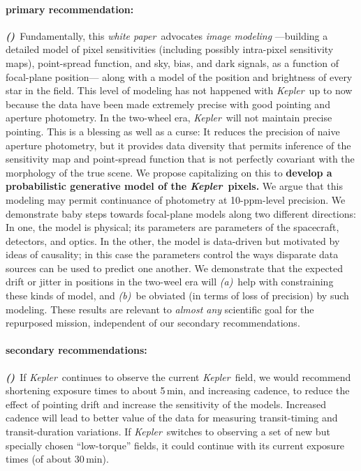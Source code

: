 \documentclass[letterpaper,12pt,preprint]{aastex}
\newcommand{\documentname}{\textsl{white paper}}
\newcommand{\observatory}[1]{\textsl{#1}}
\newcommand{\kepler}{\observatory{Kepler}}
\newcommand{\Kepler}{\kepler}
\newcounter{hoggitem}
\newcommand{\hoggitem}{\refstepcounter{hoggitem}\textbf{\textsl{(\thehoggitem)}}}
\begin{document}
\paragraph{primary recommendation:}
\hoggitem~Fundamentally, this \documentname\ advocates \emph{image modeling}%
  ---building a detailed model of pixel sensitivities
  (including possibly intra-pixel sensitivity maps),
  point-spread function,
  and sky, bias, and dark signals,
  as a function of focal-plane position---%
  along with a model of the position and brightness of every star in the field.
This level of modeling has not happened with \Kepler\ up to now
  because the data have been made extremely precise with good pointing
  and aperture photometry.
In the two-wheel era, \Kepler\ will not maintain precise pointing.
This is a blessing as well as a curse:
It reduces the precision of naive aperture photometry,
  but it provides data diversity that permits inference
  of the sensitivity map and point-spread function
  that is not perfectly covariant with the morphology of the true scene.
We propose capitalizing on this to
  \textbf{develop a probabilistic generative model of the \Kepler\ pixels.}
We argue that this modeling may permit continuance of photometry at 10-ppm-level precision.
We demonstrate baby steps towards focal-plane models
  along two different directions:
In one, the model is physical;
  its parameters are parameters of the spacecraft, detectors, and optics.
In the other, the model is data-driven but motivated by ideas of causality;
  in this case the parameters control the ways
  disparate data sources can be used to predict one another.
We demonstrate that the expected drift or jitter in positions in the two-weel era
  will \textsl{(a)}~help with constraining these kinds of model,
  and \textsl{(b)}~be obviated (in terms of loss of precision) by such modeling.
These results are relevant to \emph{almost any} scientific goal for the repurposed mission,
  independent of our secondary recommendations.

\paragraph{secondary recommendations:}
\hoggitem~If \Kepler\ continues to observe the current \Kepler\ field,
  we would recommend shortening exposure times to about 5\,min, and increasing cadence,
  to reduce the effect of pointing drift and increase the sensitivity of the models.
Increased cadence will lead to better value of the data for measuring
  transit-timing and transit-duration variations.
If \Kepler\ switches to observing a set of new but specially chosen ``low-torque'' fields,
  it could continue with its current exposure times (of about 30\,min).
\end{document}
